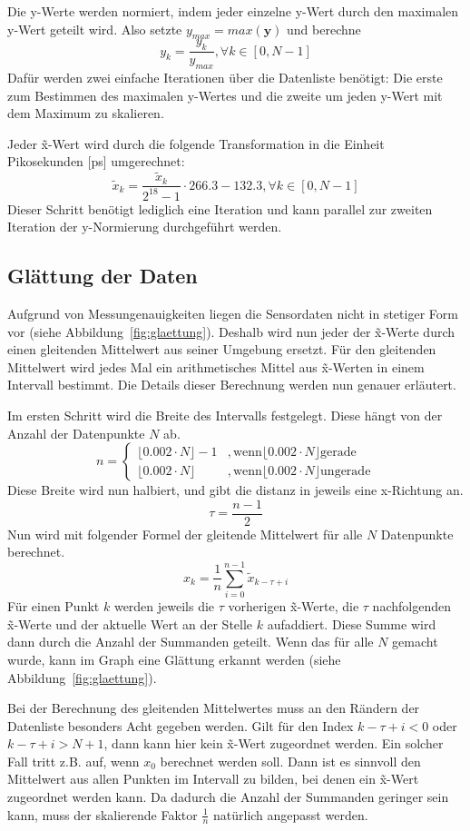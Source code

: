 Die y-Werte werden normiert, indem jeder einzelne y-Wert durch den maximalen y-Wert geteilt wird.
Also setzte $y_{max} = max(\bm{y})$ und berechne
\[
    y_k = \frac{y_k}{y_{max}}, \forall k \in [0, N - 1]
\]
Dafür werden zwei einfache Iterationen über die Datenliste benötigt:
Die erste zum Bestimmen des maximalen y-Wertes und die zweite um jeden y-Wert mit dem Maximum zu skalieren.

Jeder \~x-Wert wird durch die folgende Transformation in die Einheit Pikosekunden [ps] umgerechnet:
\[
    \tilde{x}_k = \frac{\tilde{x}_k}{2^{18} - 1} \cdot 266.3 - 132.3, \forall k \in [0, N - 1]
\]
Dieser Schritt benötigt lediglich eine Iteration und kann parallel zur zweiten Iteration der y-Normierung durchgeführt werden.

\subsection{Glättung der Daten}\label{subsec:glaettung}
Aufgrund von Messungenauigkeiten liegen die Sensordaten nicht in stetiger Form vor (siehe Abbildung~\ref{fig:glaettung}).
Deshalb wird nun jeder der \~x-Werte durch einen gleitenden Mittelwert aus seiner Umgebung ersetzt.
Für den gleitenden Mittelwert wird jedes Mal ein arithmetisches Mittel aus \~x-Werten in einem Intervall bestimmt.
Die Details dieser Berechnung werden nun genauer erläutert.

Im ersten Schritt wird die Breite des Intervalls festgelegt.
Diese hängt von der Anzahl der Datenpunkte $N$ ab.
\[
    n =
    \begin{cases}
        \lfloor0.002 \cdot N \rfloor - 1 & , \text{wenn} \lfloor0.002 \cdot N \rfloor \text{gerade} \\
        \lfloor0.002 \cdot N \rfloor     & , \text{wenn} \lfloor0.002 \cdot N \rfloor \text{ungerade}
    \end{cases}
\]
Diese Breite wird nun halbiert, und gibt die distanz in jeweils eine x-Richtung an.
\[
    \tau = \frac{n - 1}{2}
\]
Nun wird mit folgender Formel der gleitende Mittelwert für alle $N$ Datenpunkte berechnet.
\[
    x_k = \frac{1}{n} \sum_{i = 0}^{n - 1} \tilde{x}_{k-\tau+i}
\]
Für einen Punkt $k$ werden jeweils die $\tau$ vorherigen \~x-Werte, die $\tau$ nachfolgenden \~x-Werte und der aktuelle Wert an der Stelle $k$ aufaddiert.
Diese Summe wird dann durch die Anzahl der Summanden geteilt.
Wenn das für alle $N$ gemacht wurde, kann im Graph eine Glättung erkannt werden (siehe Abbildung~\ref{fig:glaettung}).

Bei der Berechnung des gleitenden Mittelwertes muss an den Rändern der Datenliste besonders Acht gegeben werden.
Gilt für den Index $k-\tau+i < 0$ oder $k-\tau+i > N + 1$, dann kann hier kein \~x-Wert zugeordnet werden.
Ein solcher Fall tritt z.B. auf, wenn $x_0$ berechnet werden soll.
Dann ist es sinnvoll den Mittelwert aus allen Punkten im Intervall zu bilden, bei denen ein \~x-Wert zugeordnet werden kann.
Da dadurch die Anzahl der Summanden geringer sein kann, muss der skalierende Faktor $\frac{1}{n}$ natürlich angepasst werden.


